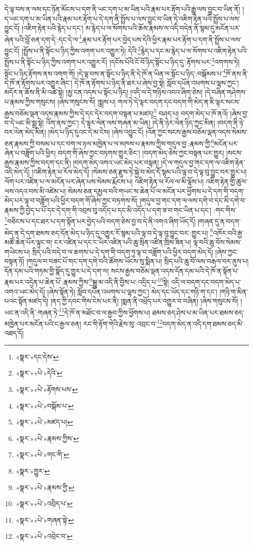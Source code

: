 དེ་ལྟ་བས་ན་ལས་དང་ཉོན་མོངས་པ་དག་ནི་ཡང་དག་པ་མ་ཡིན་པའི་རྣམ་པར་རྟོག་པའི་རྒྱུ་ལས་བྱུང་བ་ཡིན་ནོ། །ད་ཡང་དག་པ་མ་ཡིན་པའི་རྣམ་པར་རྟོག་པ་དེ་དག་ནི་སྤྲོས་པ་ལས་བྱུང་བ་ཡིན་ཏེ་འཇིག་རྟེན་པའི་སྤྲོས་པ་ལས་བྱུང་ངོ། །འཇིག་རྟེན་པའི་རྙེད་པ་དང་། མ་རྙེད་པ་ལ་སོགས་པའི་ཆོས་རྣམས་ལ་འདི་བདེན་ནོ་སྙམ་དུ་མངོན་པར་ཞེན་པའི་བློ་ཅན་དག་དེ་:དང་དེ་ལ་\footnote{«སྣར་»དང་དེས་}རྣམ་པར་རྟོག་པར་བྱེད་པས་དེའི་ཕྱིར་རྣམ་པར་རྟོག་པ་དག་ནི་སྤྲོས་པ་ལས་བྱུང་ངོ། །སྤྲོས་པ་ནི་སྟོང་པ་ཉིད་ཀྱིས་འགག་པར་འགྱུར་ཏེ། དེའི་\footnote{«སྣར་»«པེ་»དེའི་}རྙེད་པ་དང་མ་རྙེད་པ་ལ་སོགས་པ་འཇིག་རྟེན་པའི་སྤྲོས་པ་ནི་སྟོང་པ་ཉིད་ཀྱིས་འགག་པར་འགྱུར་རོ། །དངོས་པོའི་ངོ་བོ་ཉིད་སྟོང་པ་ཉིད་དུ་:རྟོགས་པར་\footnote{«སྣར་»«པེ་»རྟོགས་པས་}འགགས་ཏེ། སྟོང་པ་ཉིད་རྟོགས་ནས་འགག་གོ། །དེ་ལྟ་བས་ན་སྟོང་པ་ཉིད་ནི་དེ་ཁོ་ན་ཡིན་ལ་སྟོང་པ་ཉིད་:བསྒོམས་པ་\footnote{«སྣར་»«པེ་»བསྒོམ་པ་}ཁོ་ནས་ནི་དེ་ཁོ་ན་རྟོགས་པར་འགྱུར་ཞིང་། དེ་ཁོ་ན་རྟོགས་པ་ཉིད་ནི་ཐར་པ་ཞེས་བྱ་སྟེ། སློབ་དཔོན་འཕགས་པ་ལྷས་ཀྱང་། མདོར་ན་ཆོས་ནི་མི་འཚེ་སྟེ། །མྱ་ངན་འདས་པ་སྟོང་པ་ཉིད། །འདི་ལ་དེ་གཉིས་འབའ་ཞིག་ཅེས། །དེ་བཞིན་གཤེགས་པ་རྣམས་ཀྱིས་གསུངས། །ཞེས་གསུངས་སོ། །སྨྲས་པ། གལ་ཏེ་དེ་ལྟར་བདག་དང་བདག་གི་མེད་ན་ཇི་ལྟར་སངས་རྒྱས་བཅོམ་ལྡན་འདས་རྣམས་ཀྱིས་དེ་དང་དེར་བདག་བསྟན་པ་མཛད།\footnote{«སྣར་»«པེ་»མཛད་པ།} བཤད་པ། བདག་མེད་པ་ཁོ་ནའོ། །ཞེས་བྱ་བ་དེ་ཡང་མི་སྨྲ་སྟེ། འོག་ནས་ཀྱང་། དེ་ལྟར་ལེན་ལས་གཞན་མ་ཡིན། །དེ་ནི་ཉེར་ལེན་ཉིད་ཀྱང་མིན། །བདག་ནི་ཉེ་བར་ལེན་མེད་མིན། །མེད་པ་ཉིད་དུའང་དེ་མ་ངེས། །ཞེས་འབྱུང་ངོ། །འོན་ཀྱང་སངས་རྒྱས་བཅོམ་ལྡན་འདས་སེམས་ཅན་རྣམས་ཀྱི་བསམ་པ་དང་བག་ལ་ཉལ་མཁྱེན་པ་ལ་མཁས་པ་རྣམས་ཀྱིས་གདུལ་བྱ་:རྣམས་ཀྱི་\footnote{«སྣར་»«པེ་»རྣམས་ཀྱིས་}མངོན་པར་ཞེན་པ་བཟློག་པའི་ཕྱིར། བདག་གོ་ཞེས་ཀྱང་བཏགས་གྱུར་ཅིང་། །བདག་མེད་ཅེས་ཀྱང་བསྟན་པར་གྱུར། །སངས་རྒྱས་རྣམས་ཀྱིས་བདག་དང་ནི། །བདག་མེད་འགའ་ཡང་མེད་པར་བསྟན། །དེ་ལ་གདུལ་བྱ་གང་དག་ལ་འཇིག་རྟེན་འདི་མེད་དོ། །འཇིག་རྟེན་ཕ་རོལ་མེད་དོ། །སེམས་ཅན་རྫུས་ཏེ་སྐྱེ་བ་མེད་དོ་སྙམ་པའི་ལྟ་བ་དེ་ལྟ་བུ་བྱུང་བར་གྱུར་པ། ལོག་པར་འཛིན་པ་ལ་མངོན་པར་ཞེན་པས་སེམས་རྨོངས་པ། འཇིག་རྟེན་ཕ་རོལ་ལ་མི་ལྟོས་པ། འཇིག་རྟེན་གྱི་ཚུལ་ལས་འདའ་བས་མི་འཛེམ་པ། སེམས་ཅན་དམྱལ་བའི་གཡང་ས་ཆེན་པོ་ལ་མངོན་པར་ཕྱོགས་པ་དེ་དག་གི་བདག་མེད་པར་ལྟ་བ་བཟློག་པའི་ཕྱིར་བདག་གོ་ཞེས་ཀྱང་བཏགས་སོ། །གདུལ་བྱ་གང་དག་ལ་ལས་དགེ་བ་དང་མི་དགེ་བ་རྣམས་ཀྱི་བྱེད་པ་པོ་དང་དེ་དག་གི་འབྲས་བུ་འདོད་པ་དང་མི་འདོད་པ་དག་ཟ་བ་གང་ཡིན་པ་དང་། :གང་གིས་\footnote{«སྣར་»«པེ་»གང་གི་}བཅིངས་པ་དང་ཐར་པ་དག་སྟོན་པར་བྱེད་པའི་བདག་ཅེས་བྱ་བ་དེ་ནི་འགའ་ཞིག་ཡོད་དོ། །གཞན་དུ་ན་བདག་མེད་ན་དེ་དག་ཐམས་ཅད་དོན་མེད་པ་ཉིད་དུ་འགྱུར་རོ་སྙམ་པའི་ལྟ་བ་དེ་ལྟ་བུ་བྱུང་བར་:གྱུར་པ། \footnote{«སྣར་»གྱུར་}འཁོར་བའི་རྒྱ་མཚོ་ཆེན་པོར་ལྟུང་བ། ངར་འཛིན་པ་དང་ང་ཡིར་འཛིན་པའི་ཆུ་སྲིན་འཛིན་ཁྲིས་ཟིན་པ། ལྟ་བའི་ཆུ་བོས་སེམས་གཡེངས་པ། སྲིད་པའི་བདེ་བ་ལ་ཆགས་པ་དེ་དག་གི་བདག་ཏུ་ལྟ་བ་བཟློག་པའི་ཕྱིར་བདག་མེད་དོ། །ཞེས་ཀྱང་བསྟན་ཏོ། །གདུལ་བ་བཟང་པོ་གང་དག་དགེ་བའི་ཚོགས་ཡོངས་སུ་སྨིན་པ། སྲིད་པའི་ཆུ་བོ་ལས་བརྒལ་བར་ནུས་པ། དོན་དམ་པའི་གཏམ་གྱི་སྣོད་དུ་གྱུར་པ་དེ་དག་ལ། སངས་རྒྱས་བཅོམ་ལྡན་འདས་དོན་དམ་པའི་དེ་ཁོ་ན་སྟོན་པ་རྣམ་པར་འདྲེན་པ་ཆེན་པོ་:རྣམས་ཀྱིས་\footnote{«སྣར་»«པེ་»རྣམས་ཀྱི་}སྒྱུ་མ་འདི་ནི་བྱིས་པ་:འདྲིད་པ་\footnote{«སྣར་»«པེ་»འབྲིད་པ་}སྟེ། འདི་ལ་བདག་དང་བདག་མེད་པ་འགའ་ཡང་མེད་དོ། །ཞེས་སྟོན་ཏེ། སློབ་དཔོན་འཕགས་པ་ལྷས་ཀྱང་། མེད་དང་ཡོད་དང་གཉི་ག་དང་། །གཉི་ག་མིན་པའང་སྟོན་མཛད་དེ། །ནད་ཀྱི་དབང་གིས་ངེས་པར་ནི། །སྨན་ནི་འཕྲོད་པར་འགྱུར་བ་བཞིན། །ཞེས་གསུངས་སོ། །ཡང་ན་འདི་ནི་:གཞན་ཏེ་\footnote{«སྣར་»«པེ་»གཞན་སྟེ་}དེ་ཁོ་ན་མཐོང་བ་ལ་རྒྱབ་ཀྱིས་ཕྱོགས་པ། ཐམས་ཅད་ཤེས་པ་མ་ཡིན་པར་ཐམས་ཅད་མཁྱེན་པར་མངོན་པའི་ང་རྒྱལ་ཅན། རང་གི་རྟོག་གེའི་རྗེས་སུ་:འབྲང་བ་\footnote{«སྣར་»«པེ་»འབྲེང་བ་}བདག་མེད་ན་འདི་དག་ཐམས་ཅད་མི་འཐད་དོ། 